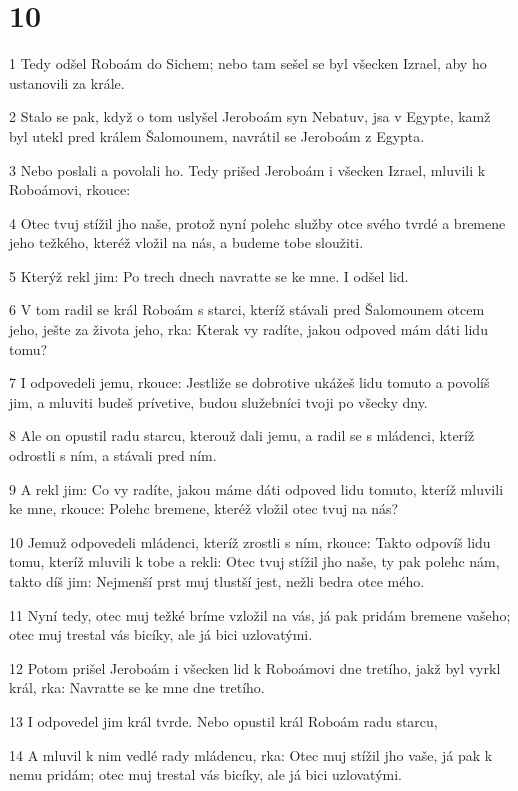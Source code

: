 \chapter{10}

\par 1 Tedy odšel Roboám do Sichem; nebo tam sešel se byl všecken Izrael, aby ho ustanovili za krále.
\par 2 Stalo se pak, když o tom uslyšel Jeroboám syn Nebatuv, jsa v Egypte, kamž byl utekl pred králem Šalomounem, navrátil se Jeroboám z Egypta.
\par 3 Nebo poslali a povolali ho. Tedy prišed Jeroboám i všecken Izrael, mluvili k Roboámovi, rkouce:
\par 4 Otec tvuj stížil jho naše, protož nyní polehc služby otce svého tvrdé a bremene jeho težkého, kteréž vložil na nás, a budeme tobe sloužiti.
\par 5 Kterýž rekl jim: Po trech dnech navratte se ke mne. I odšel lid.
\par 6 V tom radil se král Roboám s starci, kteríž stávali pred Šalomounem otcem jeho, ješte za života jeho, rka: Kterak vy radíte, jakou odpoved mám dáti lidu tomu?
\par 7 I odpovedeli jemu, rkouce: Jestliže se dobrotive ukážeš lidu tomuto a povolíš jim, a mluviti budeš prívetive, budou služebníci tvoji po všecky dny.
\par 8 Ale on opustil radu starcu, kterouž dali jemu, a radil se s mládenci, kteríž odrostli s ním, a stávali pred ním.
\par 9 A rekl jim: Co vy radíte, jakou máme dáti odpoved lidu tomuto, kteríž mluvili ke mne, rkouce: Polehc bremene, kteréž vložil otec tvuj na nás?
\par 10 Jemuž odpovedeli mládenci, kteríž zrostli s ním, rkouce: Takto odpovíš lidu tomu, kteríž mluvili k tobe a rekli: Otec tvuj stížil jho naše, ty pak polehc nám, takto díš jim: Nejmenší prst muj tlustší jest, nežli bedra otce mého.
\par 11 Nyní tedy, otec muj težké bríme vzložil na vás, já pak pridám bremene vašeho; otec muj trestal vás bicíky, ale já bici uzlovatými.
\par 12 Potom prišel Jeroboám i všecken lid k Roboámovi dne tretího, jakž byl vyrkl král, rka: Navratte se ke mne dne tretího.
\par 13 I odpovedel jim král tvrde. Nebo opustil král Roboám radu starcu,
\par 14 A mluvil k nim vedlé rady mládencu, rka: Otec muj stížil jho vaše, já pak k nemu pridám; otec muj trestal vás bicíky, ale já bici uzlovatými.

